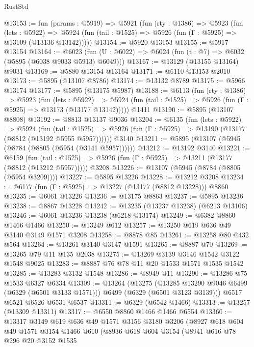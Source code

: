\begin{lexlean}{RustStd}
\begin{coremodule}
{\begin{coremodule}
{{{{{{{{{{{{{{{{{{{{{{{{{{{{{{{{{{{@13153 := fun (params : @5919) =>
  @5921
    (fun (rty : @1386) =>
    @5923
      (fun (lets : @5922) =>
      @5924 (fun (tail : @1525) => @5926 (fun (Γ : @5925) => @13109 (@13136 @13142)))))
@13154 := @5920 @13153
@13155 := @5917 @13154
@13164 := @6023 (fun (U : @6022) => @6024 (fun (t : @7) => @6032 (@5895 (@6038 @9033 @5913) @6049)))
@13167 := @13129 (@13155 @13164) @9031
@13169 := @5880 @13154 @13164
@13171 := @6110 @13153 @2010
@13173 := @5895 (@13107 @8786)
@13174 := @13132 @8789
@13175 := @5966 @13174
@13177 := @5895 (@13175 @5987)
@13188 := @6113
    (fun (rty : @1386) =>
    @5923
      (fun (lets : @5922) =>
      @5924 (fun (tail : @1525) => @5926 (fun (Γ : @5925) => @13173 (@13177 @13142)))))
    @1411
@13190 := @5895 (@13107 @8808)
@13192 := @8813 @13137 @9036
@13204 := @6135
    (fun (lets : @5922) =>
    @5924
      (fun (tail : @1525) =>
      @5926 (fun (Γ : @5925) => @13190 (@13177 (@8812 (@13192 @5955 @5957))))))
    @3140
@13211 := @5895 (@13107 (@5945 (@8784 (@8805 (@5954 (@3141 @5957))))))
@13212 := @13192 @3140
@13221 := @6159
    (fun (tail : @1525) => @5926 (fun (Γ : @5925) => @13211 (@13177 (@8812 (@13212 @5957)))))
    @3208
@13226 := @13107 (@5945 (@8784 (@8805 (@5954 @3209))))
@13227 := @5895 @13226
@13228 := @13212 @3208
@13234 := @6177 (fun (Γ : @5925) => @13227 (@13177 (@8812 @13228))) @8860
@13235 := @6061 @13226
@13236 := @13175 @8863
@13237 := @5895 @13236
@13238 := @8867 @13228
@13242 := @13235 (@13237 @13238) (@6213 @13106)
@13246 := @6061 @13236 @13238 (@6218 @13174)
@13249 := @6382 @8860 @1466 @1466
@13250 := @13249 @612
@13257 := @13250 @619 @636 @49 @3140 @3149 @1571 @3208
@13258 := @8878 @85
@13261 := @13258 @80 @432 @564
@13264 := @13261 @3140 @3147 @1591
@13265 := @8887 @70
@13269 := @13265 @79 @11 @135 @2038
@13275 := @13269 @3139 @3146 @1542 @3122 @1548 @9025
@13283 := @8887 @76 @78 @11 @20 @1533 @1571 @1535 @1542
@13285 := @13283 @3132 @1548
@13286 := @8949 @11
@13290 := @13286 @75 @1533 @6327 @6334
@13309 := @13264
    (@13275
      (@13285 @13290 @9046 @6499 (@6329 (@6501 @3133 @1571)))
      @6499
      (@6329 (@6501 @3123 @3139)))
    @6517
    @6521
    @6526
    @6531
    @6537
@13311 := @6329 (@6542 @1466)
@13313 := @13257 (@13309 @13311)
@13317 := @6550 @8860 @1466 @1466 @6554
@13360 := @13317
    @3149
    @619
    @636
    @49
    @1571
    @3156
    @3180
    @3206
    (@8927
      @618
      @604
      @49
      @1571
      @3154
      @1466
      @610
      (@8936
        @618
        @604
        @3154
        (@8941
          @616
          @78
          @296
          @20
          @3152
          @1535
}}}}}}}}}}}}}}}}}}}}}}}}}}}}}}}}}}}
\end{coremodule}}
\end{coremodule}
\end{lexlean}
